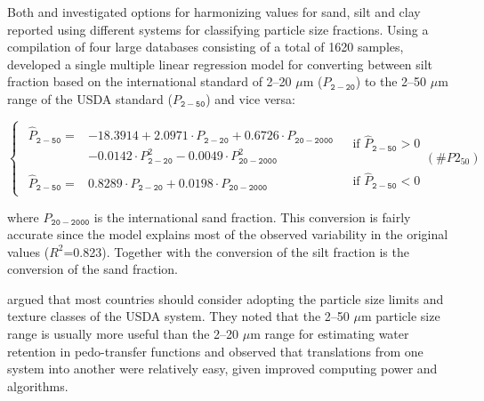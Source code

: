 \documentclass[graybox,natbib,nospthms,UStrade]{svmono}
\begin{document}
Both \citet{Nemes1999G} and \citet{Minasny2001AJSR} investigated options for
harmonizing values for sand, silt and clay reported using different
systems for classifying particle size fractions. Using a compilation of
four large databases consisting of a total of 1620 samples,
\citet{Minasny2001AJSR} developed a single multiple linear regression model for
converting between silt fraction based on the international standard of
2--20 \(\mu\)m (\(P_{\mathtt{2-20}}\)) to the 2--50 \(\mu\)m range of the USDA standard
(\(P_{\mathtt{2-50}}\)) and vice versa:

\begin{equation}
\begin{cases}
\begin{matrix} \hat P_{\mathtt{2-50}} = & -18.3914 + 2.0971 \cdot P_{\mathtt{2-20}} + 0.6726 \cdot P_{\mathtt{20-2000}}   \\
   & - 0.0142 \cdot P_{\mathtt{2-20}}^2  - 0.0049 \cdot P_{\mathtt{20-2000}}^2
\end{matrix}   & \text{ if } \hat P_{\mathtt{2-50}} > 0 \\ \begin{matrix} \hat P_{\mathtt{2-50}} = & 0.8289 \cdot P_{\mathtt{2-20}} + 0.0198 \cdot P_{\mathtt{20-2000}} \end{matrix} & \text{ if } \hat P_{\mathtt{2-50}} < 0
\end{cases}
(\#P2_50)
\end{equation}

where \(P_{\mathtt{20-2000}}\) is the international sand fraction. This
conversion is fairly accurate since the model explains most of the observed variability
in the original values (\(R^2\)=0.823). Together with the conversion of
the silt fraction is the conversion of the sand fraction.

\citet{Minasny2001AJSR} argued that most countries should consider adopting the
particle size limits and texture classes of the USDA system. They noted
that the 2--50 \(\mu\)m particle size range is usually more useful than the 2--20 \(\mu\)m range
for estimating water retention in pedo-transfer functions and observed
that translations from one system into another were relatively easy,
given improved computing power and algorithms.
\end{document}
